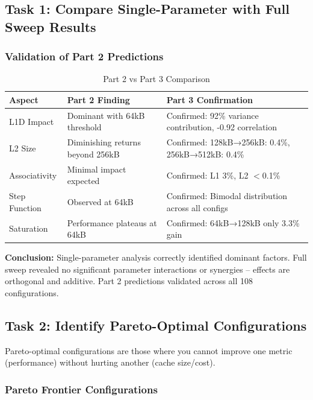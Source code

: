 \documentclass[11pt,a4paper]{article}
\begin{document}
\subsection{Task 1: Compare Single-Parameter with Full Sweep Results}

\subsubsection{Validation of Part 2 Predictions}

\begin{table}[H]
\centering
\caption{Part 2 vs Part 3 Comparison}
\begin{tabular}{p{4cm}p{5cm}p{5cm}}
\toprule
\textbf{Aspect} & \textbf{Part 2 Finding} & \textbf{Part 3 Confirmation} \\
\midrule
L1D Impact & Dominant with 64kB threshold & Confirmed: 92\% variance contribution, -0.92 correlation \\
L2 Size & Diminishing returns beyond 256kB & Confirmed: 128kB→256kB: 0.4\%, 256kB→512kB: 0.4\% \\
Associativity & Minimal impact expected & Confirmed: L1 3\%, L2 $<$0.1\% \\
Step Function & Observed at 64kB & Confirmed: Bimodal distribution across all configs \\
Saturation & Performance plateaus at 64kB & Confirmed: 64kB→128kB only 3.3\% gain \\
\bottomrule
\end{tabular}
\end{table}

\textbf{Conclusion:} Single-parameter analysis correctly identified dominant factors. Full sweep revealed no significant parameter interactions or synergies -- effects are orthogonal and additive. Part 2 predictions validated across all 108 configurations.

\subsection{Task 2: Identify Pareto-Optimal Configurations}

Pareto-optimal configurations are those where you cannot improve one metric (performance) without hurting another (cache size/cost).

\subsubsection{Pareto Frontier Configurations}
\end{document}
